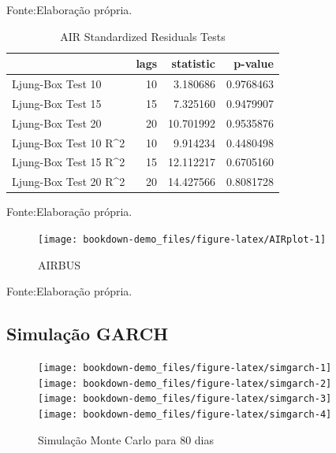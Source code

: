 \documentclass[
  12pt,
  a4paper,
  openany]{book}
\begin{document}
Fonte:Elaboração própria.

\justifying
\bigskip

\begin{table}[!h]

\caption{\label{tab:unnamed-chunk-33}AIR Standardized Residuals Tests}
\centering
\begin{tabular}[t]{lrrr}
\toprule
  & lags & statistic & p-value\\
\midrule
Ljung-Box Test 10 & 10 & 3.180686 & 0.9768463\\
Ljung-Box Test 15 & 15 & 7.325160 & 0.9479907\\
Ljung-Box Test 20 & 20 & 10.701992 & 0.9535876\\
Ljung-Box Test 10 R\textasciicircum{}2 & 10 & 9.914234 & 0.4480498\\
Ljung-Box Test 15 R\textasciicircum{}2 & 15 & 12.112217 & 0.6705160\\
\addlinespace
Ljung-Box Test 20 R\textasciicircum{}2 & 20 & 14.427566 & 0.8081728\\
\bottomrule
\end{tabular}
\end{table}
\FloatBarrier
\centering

Fonte:Elaboração própria.

\justifying
\bigskip
\begin{figure}

{\centering \texttt{[image: bookdown-demo\_files/figure-latex/AIRplot-1]} 

}

\caption{AIRBUS}\label{fig:AIRplot}
\end{figure}
\FloatBarrier
\centering

Fonte:Elaboração própria.

\justifying
\bigskip

\hypertarget{simulauxe7uxe3o-garch}{%
\subsection{Simulação GARCH}\label{simulauxe7uxe3o-garch}}

\scriptsize

\normalsize

\scriptsize

\normalsize

\begin{figure}

{\centering \texttt{[image: bookdown-demo\_files/figure-latex/simgarch-1]} \texttt{[image: bookdown-demo\_files/figure-latex/simgarch-2]} \texttt{[image: bookdown-demo\_files/figure-latex/simgarch-3]} \texttt{[image: bookdown-demo\_files/figure-latex/simgarch-4]} 

}

\caption{Simulação Monte Carlo para 80 dias}\label{fig:simgarch}
\end{figure}
\end{document}
